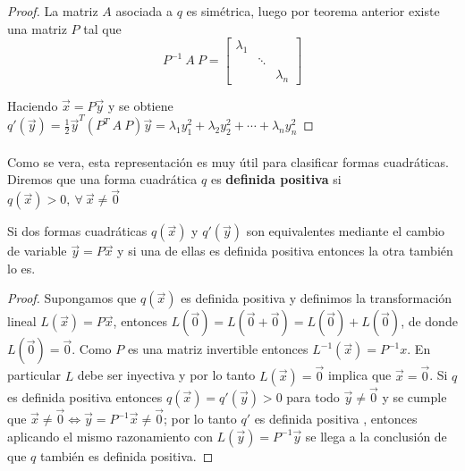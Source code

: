 \begin{proof}
La matriz $A$ asociada a $q$ es simétrica, luego por teorema anterior existe una matriz $P$ tal que 
\begin{equation*}
    P^{-1}~A~P = \begin{bmatrix}
    \lambda_{1} & &\\
    & \ddots & \\
    & & \lambda_{n}
    \end{bmatrix}
    \label{ecuacion:1.4}
\end{equation*}

Haciendo $\overrightarrow{x} = P\overrightarrow{y}$ y se obtiene $q'(\overrightarrow{y}) = \frac{1}{2}\overrightarrow{y}^{T}\left(P^{T}~A~P\right)\overrightarrow{y} = \lambda_{1}y_{1}^{2} + \lambda_{2}y_{2}^{2} + \cdots + \lambda_{n}y_{n}^{2}$

\end{proof}

\paragraph*{}
Como se vera, esta representación es muy útil para clasificar formas cuadráticas. Diremos que una forma cuadrática $q$ es \textbf{definida positiva} si $q(\overrightarrow{x}) > 0, ~\forall~ \overrightarrow{x} \neq \overrightarrow{0}$ 

\begin{lemma}
Si dos formas cuadráticas $q(\overrightarrow{x})$ y $q'(\overrightarrow{y})$ son equivalentes mediante el cambio de variable $\overrightarrow{y} = P\overrightarrow{x}$ y si una de ellas es definida positiva entonces la otra también lo es.
\label{lema:1.3}
\end{lemma}

\begin{proof}
Supongamos que $q(\overrightarrow{x})$ es definida positiva y definimos la transformación lineal $L(\overrightarrow{x}) = P\overrightarrow{x}$, entonces $L(\overrightarrow{0}) = L(\overrightarrow{0}+ \overrightarrow{0}) = L(\overrightarrow{0}) + L(\overrightarrow{0})$, de donde $L(\overrightarrow{0}) = \overrightarrow{0}$. Como $P$ es una matriz invertible entonces $L^{-1}(\overrightarrow{x}) = P^{-1}x$. En particular $L$ debe ser inyectiva y por lo tanto $L(\overrightarrow{x})=\overrightarrow{0}$ implica que $\overrightarrow{x}=\overrightarrow{0}$. Si $q$ es definida positiva entonces $q(\overrightarrow{x}) = q'(\overrightarrow{y}) > 0$ para todo $\overrightarrow{y} \neq \overrightarrow{0}$ y se cumple que $\overrightarrow{x} \neq \overrightarrow{0} \Leftrightarrow \overrightarrow{y} = P^{-1}\overrightarrow{x} \neq \overrightarrow{0}$; por lo tanto $q'$ es definida positiva , entonces aplicando el mismo razonamiento con $L(\overrightarrow{y}) = P^{-1}\overrightarrow{y}$ se llega a la conclusión de que $q$ también es definida positiva. 
\end{proof}

